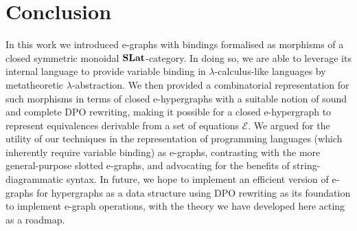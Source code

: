 \documentclass[acmsmall,screen, nonacm, review, anonymous]{acmart}
\begin{document}
\section{Conclusion}
In this work we introduced e-graphs with bindings formalised as morphisms of a closed symmetric monoidal $\mathbf{SLat}$-category.
In doing so, we are able to leverage its internal language to provide variable binding in $\lambda$-calculus-like languages by metatheoretic $\lambda$-abstraction.
We then provided a combinatorial representation for such morphisms in terms of closed e-hypergraphs with a suitable notion of sound and complete DPO rewriting, making it possible for a closed e-hypergraph to represent equivalences derivable from a set of equations $\mathcal{E}$.
We argued for the utility of our techniques in the representation of programming languages (which inherently require variable binding) as e-graphs, contrasting with the more general-purpose slotted e-graphs, and advocating for the benefits of string-diagrammatic syntax.
In future, we hope to implement an efficient version of e-graphs for hypergraphs as a data structure using DPO rewriting as its foundation to implement e-graph operations, with the theory we have developed here acting as a roadmap.




\appendix


\end{document}

